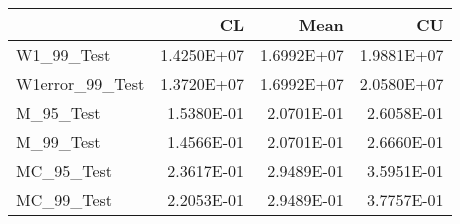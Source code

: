\begin{tabular}{lrrr}
\toprule
{} &         CL &       Mean &         CU \\
\midrule
W1\_99\_Test      & 1.4250E+07 & 1.6992E+07 & 1.9881E+07 \\
W1error\_99\_Test & 1.3720E+07 & 1.6992E+07 & 2.0580E+07 \\
M\_95\_Test       & 1.5380E-01 & 2.0701E-01 & 2.6058E-01 \\
M\_99\_Test       & 1.4566E-01 & 2.0701E-01 & 2.6660E-01 \\
MC\_95\_Test      & 2.3617E-01 & 2.9489E-01 & 3.5951E-01 \\
MC\_99\_Test      & 2.2053E-01 & 2.9489E-01 & 3.7757E-01 \\
\bottomrule
\end{tabular}
